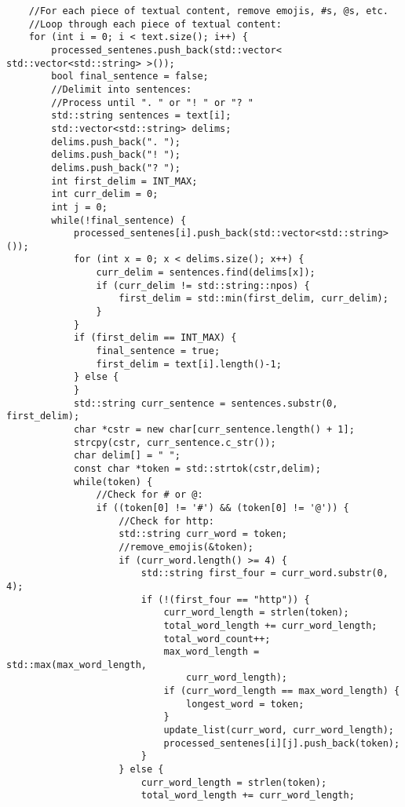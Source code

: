 \documentclass[a4paper,11pt]{article}
\begin{document}
\begin{appendices}
\begin{verbatim}
    //For each piece of textual content, remove emojis, #s, @s, etc.
    //Loop through each piece of textual content:
    for (int i = 0; i < text.size(); i++) {
        processed_sentenes.push_back(std::vector< std::vector<std::string> >());
        bool final_sentence = false;
        //Delimit into sentences:
        //Process until ". " or "! " or "? "
        std::string sentences = text[i];
        std::vector<std::string> delims;
        delims.push_back(". ");
        delims.push_back("! ");
        delims.push_back("? ");
        int first_delim = INT_MAX;
        int curr_delim = 0;
        int j = 0;
        while(!final_sentence) {
            processed_sentenes[i].push_back(std::vector<std::string>());
            for (int x = 0; x < delims.size(); x++) {
                curr_delim = sentences.find(delims[x]);
                if (curr_delim != std::string::npos) {
                    first_delim = std::min(first_delim, curr_delim);
                }
            }
            if (first_delim == INT_MAX) {
                final_sentence = true;
                first_delim = text[i].length()-1;
            } else {
            }
            std::string curr_sentence = sentences.substr(0, first_delim);
            char *cstr = new char[curr_sentence.length() + 1];
            strcpy(cstr, curr_sentence.c_str());
            char delim[] = " ";
            const char *token = std::strtok(cstr,delim);
            while(token) {
                //Check for # or @:
                if ((token[0] != '#') && (token[0] != '@')) {
                    //Check for http:
                    std::string curr_word = token;
                    //remove_emojis(&token);
                    if (curr_word.length() >= 4) {
                        std::string first_four = curr_word.substr(0, 4);
                        if (!(first_four == "http")) {
                            curr_word_length = strlen(token);
                            total_word_length += curr_word_length;
                            total_word_count++;
                            max_word_length = std::max(max_word_length, 
                                curr_word_length);
                            if (curr_word_length == max_word_length) {
                                longest_word = token;
                            }
                            update_list(curr_word, curr_word_length);
                            processed_sentenes[i][j].push_back(token);
                        }
                    } else {
                        curr_word_length = strlen(token);
                        total_word_length += curr_word_length;

\end{verbatim}
\end{appendices}
\end{document}
